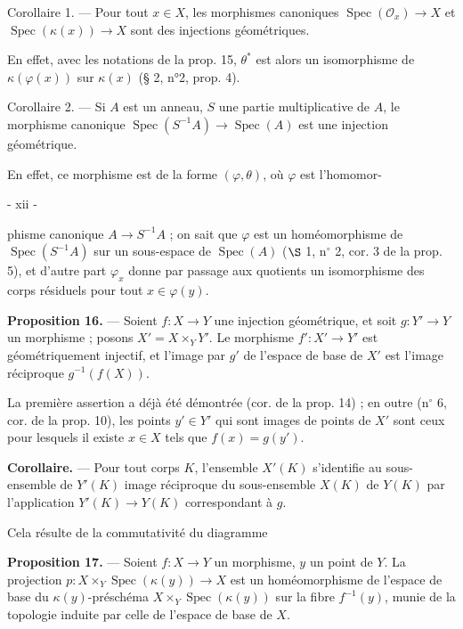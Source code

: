 Corollaire 1. — Pour tout $x \in X$, les morphismes canoniques $\operatorname{Spec}(\mathcal{O}_x) \to X$ et $\operatorname{Spec}(\kappa(x)) \to X$ sont des injections géométriques.

En effet, avec les notations de la prop. 15, $\theta^*$ est alors un isomorphisme de $\kappa(\varphi(x))$ sur $\kappa(x)$ (§ 2, n°2, prop. 4).

Corollaire 2. — Si $A$ est un anneau, $S$ une partie multiplicative de $A$, le morphisme canonique $\operatorname{Spec}(S^{-1}A) \to \operatorname{Spec}(A)$ est une injection géométrique.

En effet, ce morphisme est de la forme $(\varphi, \theta)$, où $\varphi$ est l'homomor-

\newpage


- xii -

phisme canonique $A \to S^{-1}A$ ; on sait que $\varphi$ est un homéomorphisme de $\operatorname{Spec}(S^{-1}A)$ sur un sous-espace de $\operatorname{Spec}(A)$ ($\S$ 1, n$^\circ$ 2, cor. 3 de la prop. 5), et d'autre part $\varphi_x$ donne par passage aux quotients un isomorphisme des corps résiduels pour tout $x \in \varphi(y)$.

\textbf{Proposition 16.} --- Soient $f : X \to Y$ une injection géométrique, et soit $g : Y' \to Y$ un morphisme ; posons $X' = X \times_Y Y'$. Le morphisme $f' : X' \to Y'$ est géométriquement injectif, et l'image par $g'$ de l'espace de base de $X'$ est l'image réciproque $g^{-1}(f(X))$.

La première assertion a déjà été démontrée (cor. de la prop. 14) ; en outre (n$^\circ$ 6, cor. de la prop. 10), les points $y' \in Y'$ qui sont images de points de $X'$ sont ceux pour lesquels il existe $x \in X$ tels que $f(x) = g(y')$.

\textbf{Corollaire.} --- Pour tout corps $K$, l'ensemble $X'(K)$ s'identifie au sous-ensemble de $Y'(K)$ image réciproque du sous-ensemble $X(K)$ de $Y(K)$ par l'application $Y'(K) \to Y(K)$ correspondant à $g$.

Cela résulte de la commutativité du diagramme
\begin{center}
\end{center}

\textbf{Proposition 17.} --- Soient $f : X \to Y$ un morphisme, $y$ un point de $Y$. La projection $p : X \times_Y \operatorname{Spec}(\kappa(y)) \to X$ est un homéomorphisme de l'espace de base du $\kappa(y)$-préschéma $X \times_Y \operatorname{Spec}(\kappa(y))$ sur la fibre $f^{-1}(y)$, munie de la topologie induite par celle de l'espace de base de $X$.

